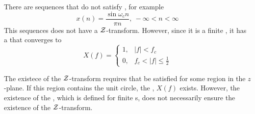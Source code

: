 There are sequences that do not satisfy , for example
\begin{equation*}
  x(n) = \frac{\sin \omega_{c}n}{\pi n}, \: -\infty < n < \infty
\end{equation*}
This sequences does not have a $\operatorname{\mathcal{Z}}$-transform.
However, since it is a finite , it has a  that converges to
\begin{equation*}
  X(f) = \begin{cases}
    1, & \lvert f \rvert < f_{c} \\
    0, & f_{c} < \lvert f \rvert \leq \frac{1}{2}
  \end{cases}
\end{equation*}

\begin{blackbox}
  The existece of the $\operatorname{\mathcal{Z}}$-transform requires that  be satisfied for some region in the $z$-plane.
  If this region contains the unit circle, the , $X(f)$ exists.
  However, the existence of the , which is defined for finite s, does not necessarily ensure the existence of the $\operatorname{\mathcal{Z}}$-transform.
\end{blackbox}


